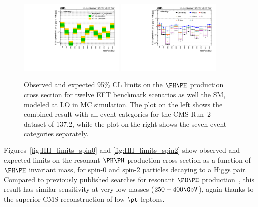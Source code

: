 \begin{figure}
  \centering
  \includegraphics[width=0.45\textwidth]{figures/bmScan_multilepton_RUN2.pdf}
  \hspace{0.05\textwidth}
  \includegraphics[width=0.45\textwidth]{figures/multiBMScan_multilepton_Run2.pdf}
  \caption{
    Observed and expected 95\% CL limits on the $\HH$ production cross section for
    twelve EFT benchmark scenarios as well the SM, modeled at LO in MC simulation.
    The plot on the left shows the combined result with all event categories for
    the CMS Run~2 dataset of 137.2\fbinv, while the plot on the right shows the
    seven event categories separately.
  }
  \label{fig:HH_limits_EFT}
\end{figure}

Figures~\ref{fig:HH_limits_spin0} and \ref{fig:HH_limits_spin2} show observed and
expected limits on the resonant $\HH$ production cross section as a function of
$\HH$ invariant mass, for spin-0 and spin-2 particles decaying to a Higgs pair.
Compared to previously published searches for resonant $\HH$
production~\cite{Sirunyan:2018ayu,2020135103},
this result has similar sensitivity at very low masses ($250 - 400\GeV$),
again thanks to the superior CMS reconstruction of low-$\pt$ leptons.

